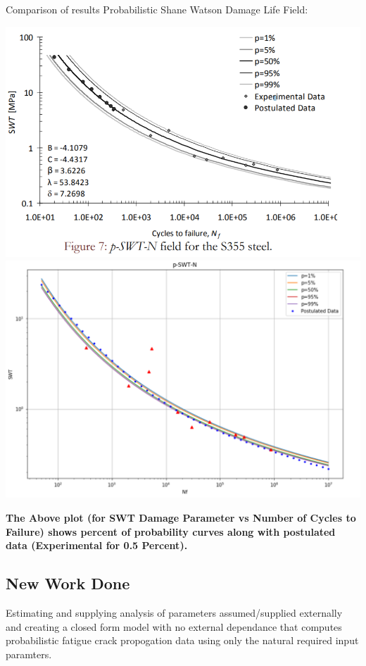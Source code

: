\documentclass[11pt]{article}
\begin{document}
Comparison of results Probabilistic Shane Watson Damage Life Field:
\begin{center}
\includegraphics[scale=0.9]{images/p_s_n_paper.PNG}
\includegraphics[scale=0.9]{images/p_s_n_model.PNG}
    
\end{center}

\textbf{The Above plot (for SWT Damage Parameter vs Number of Cycles to
Failure) shows percent of probability curves along with postulated data
(Experimental for 0.5 Percent).}

\hypertarget{new-work-done}{%
\subsection{New Work Done}\label{new-work-done}}

Estimating and supplying analysis of parameters assumed/supplied
externally and creating a closed form model with no external dependance
that computes probabilistic fatigue crack propogation data using only
the natural required input paramters.
\end{document}
